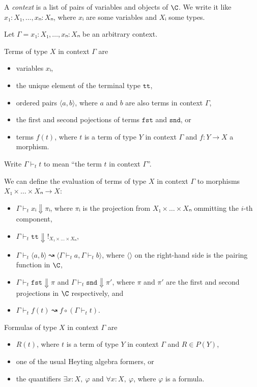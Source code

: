 A \emph{context} is a list of pairs of variables and objects of \(\C\).
We write it like \(x₁ : X₁,… , xₙ : Xₙ\), where \(xᵢ\) are some variables and \(Xᵢ\) some types.

Let \(Γ = x₁ : X₁,… , xₙ : Xₙ\) be an arbitrary context.

Terms of type \(X\) in context \(Γ\) are
\begin{itemize}
    \item variables \(xᵢ\),
    \item the unique element of the terminal type \(\texttt{tt}\),
    \item ordered pairs \(⟨a, b⟩\), where \(a\) and \(b\) are also terms in context \(Γ\),
    \item the first and second pojections of terms \(\texttt{fst}\) and \(\texttt{snd}\), or
    \item terms \(f(t)\), where \(t\) is a term of type \(Y\) in context \(Γ\) and \(f : Y → X\) a morphism.
\end{itemize}

Write \(Γ ⊢_t t\) to mean ``the term \(t\) in context \(Γ\)''.

We can define the evaluation of terms of type \(X\) in context \(Γ\) to morphisms \(X₁×\dots× Xₙ → X\):
\begin{itemize}
    \item \(Γ ⊢_t xᵢ \Downarrow πᵢ\), where \(πᵢ\) is the projection from \(X₁×\dots× Xₙ\) ommitting the \(i\)-th component,
    \item \(Γ ⊢_t \texttt{tt} \Downarrow !_{X₁×\dots× Xₙ}\),
    \item \(Γ ⊢_t ⟨a, b⟩ ↝ ⟨Γ ⊢_t a, Γ ⊢_t b⟩\), where \(⟨⟩\) on the right-hand side is the pairing function in \(\C\),
    \item \(Γ ⊢_t \texttt{fst} \Downarrow π\) and \(Γ ⊢_t \texttt{snd} \Downarrow π'\), where \(π\) and \(π'\) are the first and second projections in \(\C\) respectively, and
    \item \(Γ ⊢_t f(t) ↝ f∘(Γ ⊢_t t)\).
\end{itemize}

Formulas of type \(X\) in context \(Γ\) are
\begin{itemize}
    \item \(R(t)\), where \(t\) is a term of type \(Y\) in context \(Γ\) and \(R ∈ P(Y)\),
    \item one of the usual Heyting algebra formers, or
    \item the quantifiers \(∃ x : X,\ φ\) and \(∀ x : X,\ φ\), where \(φ\) is a formula.
\end{itemize}

